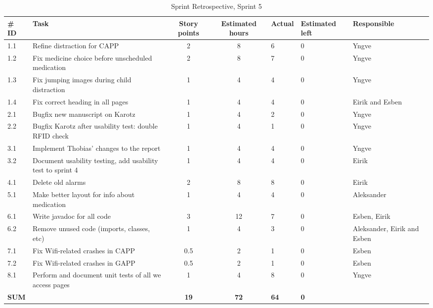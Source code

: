 \begin{table}
	\begin{center}
 	\begin{sideways}
 		\begin{tabular}{| l | p{6.5cm} | c | c | l | l | l | }
 			\hline
			\#  ID 	& Task 	& Story points 	& Estimated hours & Actual & Estimated left & Responsible \\
			\hline
 			1.1 & Refine distraction for CAPP & 2 & 8 & 6 & 0 & Yngve\\
 			\hline
 			1.2 & Fix medicine choice before unscheduled medication & 2 & 8 & 7 & 0 & Yngve\\
 			\hline
 			1.3 & Fix jumping images during child distraction & 1 & 4 & 4 & 0 & Yngve\\
 			\hline
 			1.4 & Fix correct heading in all pages & 1 & 4 & 4 & 0 & Eirik and Esben\\
 			\hline
 			2.1 & Bugfix new manuscript on Karotz & 1 & 4 & 2 & 0 & Yngve\\
 			\hline
 			2.2 & Bugfix Karotz after usability test: double RFID check & 1 & 4 & 1 & 0 & Yngve\\
 			\hline
 			3.1 & Implement Thobias' changes to the report & 1 & 4 & 4 & 0 & Yngve\\
 			\hline
 			3.2 & Document usability testing, add usability test to sprint 4 & 1 & 4 & 4 & 0 & Eirik\\
 			\hline
 			4.1 & Delete old alarms & 2 & 8 & 8 & 0 & Eirik\\
 			\hline
 			5.1 & Make better layout for info about medication & 1 & 4 & 4 & 0 & Aleksander\\
 			\hline
 			6.1 & Write javadoc for all code & 3 & 12 & 7 & 0 & Esben, Eirik\\
 			\hline
 			6.2 & Remove unused code (imports, classes, etc) & 1 & 4 & 3 & 0 & Aleksander, Eirik and Esben \\
 			\hline
 			7.1 & Fix Wifi-related crashes in CAPP & 0.5 & 2 & 1 & 0 & Esben \\
 			\hline
 			7.2 & Fix Wifi-related crashes in GAPP & 0.5 & 2 & 1 & 0 & Esben \\
 			\hline
 			8.1 & Perform and document unit tests of all we access pages & 1 & 4 & 8 & 0 & Yngve \\
 			\hline
 			\bfseries{SUM} & & \bfseries{19} & \bfseries{72} & \bfseries{64} & \bfseries{0} & \\
 			\hline
 		\end{tabular}
 	\end{sideways}
 	\end{center}
 	\caption{Sprint Retrospective, Sprint 5}
 	\label{tab:sprint5burndown}
\end{table}

